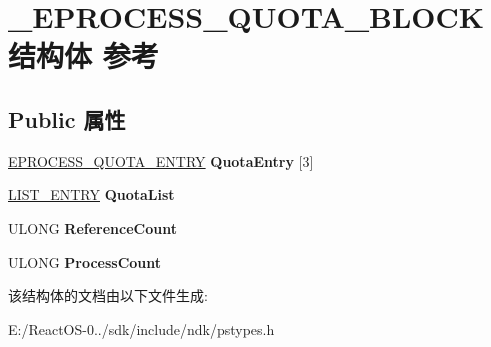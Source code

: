 \hypertarget{struct___e_p_r_o_c_e_s_s___q_u_o_t_a___b_l_o_c_k}{}\section{\+\_\+\+E\+P\+R\+O\+C\+E\+S\+S\+\_\+\+Q\+U\+O\+T\+A\+\_\+\+B\+L\+O\+C\+K结构体 参考}
\label{struct___e_p_r_o_c_e_s_s___q_u_o_t_a___b_l_o_c_k}
\subsection*{Public 属性}
\begin{DoxyCompactItemize}
\item 
\mbox{\label{struct___e_p_r_o_c_e_s_s___q_u_o_t_a___b_l_o_c_k_aff3155da0f186a5c11707e08ebc57f57}} 
\hyperlink{struct___e_p_r_o_c_e_s_s___q_u_o_t_a___e_n_t_r_y}{E\+P\+R\+O\+C\+E\+S\+S\+\_\+\+Q\+U\+O\+T\+A\+\_\+\+E\+N\+T\+RY} {\bfseries Quota\+Entry} \mbox{[}3\mbox{]}
\item 
\mbox{\label{struct___e_p_r_o_c_e_s_s___q_u_o_t_a___b_l_o_c_k_a5e37e554330d404a99f5b77311e6eaee}} 
\hyperlink{struct___l_i_s_t___e_n_t_r_y}{L\+I\+S\+T\+\_\+\+E\+N\+T\+RY} {\bfseries Quota\+List}
\item 
\mbox{\label{struct___e_p_r_o_c_e_s_s___q_u_o_t_a___b_l_o_c_k_afea594b99dab345b69075e14401416aa}} 
U\+L\+O\+NG {\bfseries Reference\+Count}
\item 
\mbox{\label{struct___e_p_r_o_c_e_s_s___q_u_o_t_a___b_l_o_c_k_a4244791b84172c4f4e3db543de758ba0}} 
U\+L\+O\+NG {\bfseries Process\+Count}
\end{DoxyCompactItemize}


该结构体的文档由以下文件生成\+:\begin{DoxyCompactItemize}
\item 
E\+:/\+React\+O\+S-\/0../sdk/include/ndk/pstypes.\+h\end{DoxyCompactItemize}
